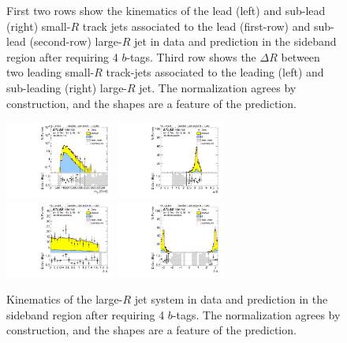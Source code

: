 \begin{figure}[htbp!]
\begin{center}
  \caption{First two rows show the kinematics of the lead (left) and sub-lead (right) small-$R$ track jets associated to the lead (first-row) and sub-lead (second-row) large-$R$ jet in data and prediction in the sideband region after requiring 4 $b$-tags. Third row shows the $\Delta R$ between two leading small-$R$ track-jets associated to the leading (left) and sub-leading (right) large-$R$ jet. The normalization agrees by construction, and the shapes are a feature of the prediction. }
  \label{fig:boosted-4b-sideband-ak2}
\end{center}
\end{figure}


\begin{figure}[htbp!]
\begin{center}
\includegraphics[width=0.32\textwidth,angle=-90]{figures/boosted/Sideband/b77_FourTag_Sideband_mHH_l_1.pdf}
\includegraphics[width=0.32\textwidth,angle=-90]{figures/boosted/Sideband/b77_FourTag_Sideband_hCandDr.pdf}\\
\includegraphics[width=0.32\textwidth,angle=-90]{figures/boosted/Sideband/b77_FourTag_Sideband_hCandDeta.pdf}
\includegraphics[width=0.32\textwidth,angle=-90]{figures/boosted/Sideband/b77_FourTag_Sideband_hCandDphi.pdf}
  \caption{Kinematics of the large-$R$ jet system in data and prediction in the sideband region after requiring 4 $b$-tags. The normalization agrees by construction, and the shapes are a feature of the prediction. }
  \label{fig:boosted-4b-sideband-ak10-system}
\end{center}
\end{figure}

